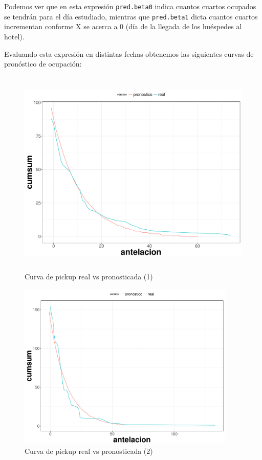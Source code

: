 Podemos ver que en esta expresión \texttt{pred.beta0} indica cuantos cuartos ocupados se tendrán para el día estudiado, mientras que \texttt{pred.beta1} dicta cuantos cuartos incrementan conforme X se acerca a 0 (día de la llegada de los huéspedes al hotel).

Evaluando esta expresión en distintas fechas obtenemos las siguientes curvas de pronóstico de ocupación:

\begin{figure}[H]
  \centering
      \includegraphics[width=\maxwidth,height=10cm]{figures/Resultados-1}  
  \caption{Curva de pickup real vs pronosticada (1)}
\end{figure}

\begin{figure}[H]
  \centering
      \includegraphics[width=\maxwidth,height=8cm]{figures/Resultados-2}  
  \caption{Curva de pickup real vs pronosticada (2)}
\end{figure}

